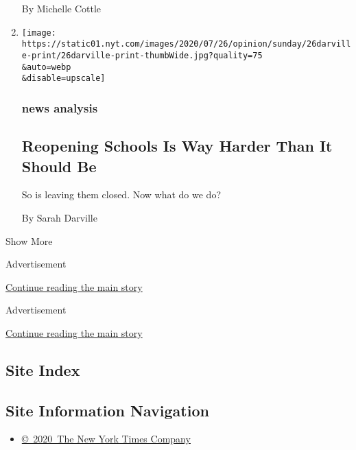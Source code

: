 \begin{enumerate}
  By Michelle Cottle
\item
  \href{/2020/07/23/sunday-review/reopening-schools-coronavirus.html}{}

  \texttt{[image: https://static01.nyt.com/images/2020/07/26/opinion/sunday/26darville-print/26darville-print-thumbWide.jpg?quality=75\\\&auto=webp\\\&disable=upscale]}

  \hypertarget{news-analysis}{%
  \subsubsection{news analysis}\label{news-analysis}}

  \hypertarget{reopening-schools-is-way-harder-than-it-should-be}{%
  \subsection{Reopening Schools Is Way Harder Than It Should
  Be}\label{reopening-schools-is-way-harder-than-it-should-be}}

  So is leaving them closed. Now what do we do?

  By Sarah Darville
\end{enumerate}

Show More

Advertisement

\protect\hyperlink{after-mid1}{Continue reading the main story}

Advertisement

\protect\hyperlink{after-mktg}{Continue reading the main story}

\hypertarget{site-index}{%
\subsection{Site Index}\label{site-index}}

\hypertarget{site-information-navigation}{%
\subsection{Site Information
Navigation}\label{site-information-navigation}}

\begin{itemize}
\tightlist
\item
  \href{https://help.nytimes.com/hc/en-us/articles/115014792127-Copyright-notice}{©~2020~The
  New York Times Company}
\end{itemize}

